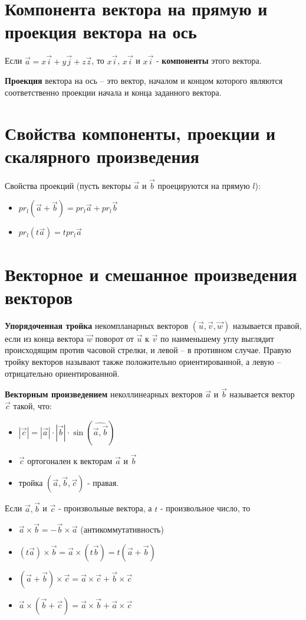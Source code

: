 \documentclass[a4paper]{article}
\begin{document}
\section*{Компонента вектора на прямую и проекция вектора на ось
}
Если $\vec{a} = x \vec{i} + y \vec{j} + z \vec{z}$, то $x \vec{i}$, $x \vec{i}$ и $x \vec{i}$ - \textbf{компоненты} этого вектора.

\textbf{Проекция} вектора на ось – это вектор, началом и концом которого являются соответственно проекции начала и конца заданного вектора.

\section*{Свойства компоненты, проекции и скалярного произведения}

Свойства проекций (пусть векторы $\vec{a}$ и $\vec{b}$ проецируются на прямую $l$):
\begin{itemize}
\item $pr_l (\vec{a} + \vec{b}) = pr_l \vec{a} + pr_l \vec{b}$
\item $pr_l (t \vec{a}) = t pr_l \vec{a}$
\end{itemize}

\section*{Векторное и смешанное произведения векторов}

\textbf{Упорядоченная тройка} некомпланарных векторов $(\vec{u}, \vec{v}, \vec{w})$  называется
правой, если из конца вектора $\vec{w}$ поворот от $\vec{u}$ к $\vec{v}$ по наименьшему углу
выглядит происходящим против часовой стрелки, и левой – в противном случае. Правую тройку векторов называют также положительно
ориентированной, а левую – отрицательно ориентированной.

\textbf{Векторным произведением} неколлинеарных векторов $\vec{a}$ и $\vec{b}$ называется
вектор $\vec{c}$ такой, что:
\begin{itemize}
\item $| \vec{c}| = | \vec{a} | \cdot | \vec{b} | \cdot \sin (\widehat{\vec{a}, \vec{b}})$
\item $\vec{c}$ ортогонален к векторам $\vec{a}$ и $\vec{b}$
\item тройка $(\vec{a}, \vec{b}, \vec{c})$ - правая.
\end{itemize}

Если $\vec{a}, \vec{b}$ и $\vec{c}$ - произвольные вектора, а $t$ - произвольное число, то
\begin{itemize}
\item $\vec{a} \times \vec{b} = -\vec{b} \times \vec{a}$ (антикоммутативность)
\item $(t \vec{a}) \times \vec{b} = \vec{a} \times (t \vec{b}) = t ( \vec{a} + \vec{b})$
\item $(\vec{a} +\vec{b}) \times \vec{c} = \vec{a} \times \vec{c} + \vec{b} \times \vec{c}$
\item $\vec{a} \times (\vec{b} + \vec{c}) = \vec{a} \times \vec{b} +\vec{a} \times \vec{c}$
\end{itemize}
\end{document}
